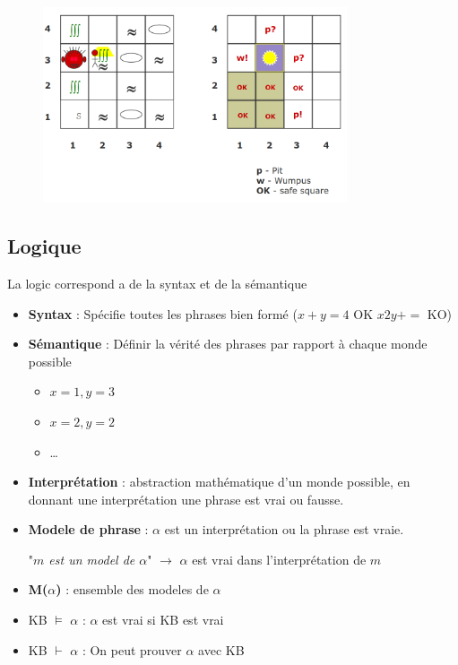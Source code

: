 		\begin{figure}[H]
			\centering
			\includegraphics[width=0.8\textwidth]{img/wumpus3.png}
		\end{figure}
	\subsection{Logique}
		
		La logic correspond a de la syntax et de la sémantique
		\begin{itemize}
			\item \textbf{Syntax} : Spécifie toutes les phrases bien formé ($x+y=4$ OK $x2y+=$ KO)
			\item \textbf{Sémantique} : Définir la vérité des phrases par rapport à chaque monde possible
			\begin{itemize}
				\item $x=1, y=3$
				\item $x=2, y=2$
				\item \dots
			\end{itemize}
			\item \textbf{Interprétation} : abstraction mathématique d'un monde possible, en donnant une interprétation une phrase est vrai ou fausse.
			\item \textbf{Modele de phrase} : $\alpha$ est un interprétation ou la phrase est vraie.
			
			"\textit{$m$ est un model de $\alpha$}" $\rightarrow$ $\alpha$ est vrai dans l'interprétation de $m$
			\item \textbf{M($\alpha$)} : ensemble des modeles de $\alpha$
			\item KB $\models$ $\alpha$ : $\alpha$ est vrai si KB est vrai
			\item KB $\vdash$ $\alpha$ : On peut prouver $\alpha$ avec KB 

		\end{itemize}
		
